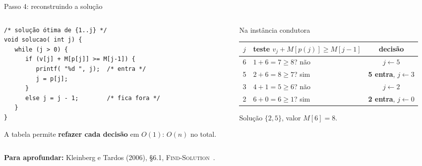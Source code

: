 \documentclass[aspectratio=169,xcolor=table]{beamer}
\newcommand{\fonte}[1]{%
  \vfill
  {\tiny\color{gray!55!black}\textbf{Para aprofundar:} #1\par}%
}
\begin{document}
\begin{frame}[fragile]{Passo 4: reconstruindo a solução}
  \begin{columns}[T]
    \begin{column}{0.48\textwidth}
\begin{lstlisting}
/* solução ótima de {1..j} */
void solucao( int j) {
   while (j > 0) {
      if (v[j] + M[p[j]] >= M[j-1]) {
         printf( "%d ", j);  /* entra */
         j = p[j];
      }
      else j = j - 1;        /* fica fora */
   }
}
\end{lstlisting}
      \scriptsize A tabela permite \textbf{refazer cada decisão} em $O(1)$: $O(n)$ no total.
    \end{column}
    \begin{column}{0.48\textwidth}
      \begin{exampleblock}{Na instância condutora}
        \scriptsize
        \begin{tabular}{clc}
          \toprule
          $j$ & teste $v_j + M[p(j)] \ge M[j-1]$ & decisão \\
          \midrule
          6 & $1 + 6 = 7 \ge 8$? não & $j \gets 5$ \\
          5 & $2 + 6 = 8 \ge 7$? sim & \textbf{5 entra}, $j \gets 3$ \\
          3 & $4 + 1 = 5 \ge 6$? não & $j \gets 2$ \\
          2 & $6 + 0 = 6 \ge 1$? sim & \textbf{2 entra}, $j \gets 0$ \\
          \bottomrule
        \end{tabular}
        \smallskip

        Solução $\{2,5\}$, valor $M[6]=8$.
      \end{exampleblock}
    \end{column}
  \end{columns}
  \fonte{Kleinberg e Tardos (2006), \S 6.1, \textsc{Find-Solution}~\cite{kleinberg2006algorithm}.}
\end{frame}
\end{document}
